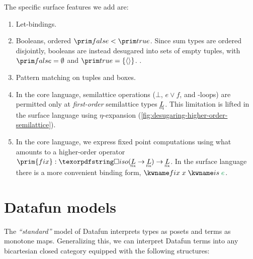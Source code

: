 \documentclass[nomarginums]{rntz}\usepackage[tablet]{fantasy}%
\begin{document}
The specific surface features we add are:
\begin{enumerate}
\item Let-bindings.

\item Booleans, ordered $\efalse < \etrue$. Since sum types are ordered
  disjointly, booleans are instead desugared into sets of empty tuples, with
  $\efalse = \emptyset$ and $\etrue = \eset{\etuple{}}$. .

\item Pattern matching on tuples and boxes. 

\item In the core language, semilattice operations ($\bot$, $e \vee f$, and
  -loops) are permitted only at \emph{first-order} semilattice types
  $\eqt L$. This limitation is lifted in the surface language using
  $\eta$-expansion (\cref{fig:desugaring-higher-order-semilattice}).

\item In the core language, we express fixed point computations using what
  amounts to a higher-order operator $\prim{fix} : \isof{(\fixt L \to \fixt L)}
  \to \fixt L$. In the surface language there is a more convenient binding form,
  $\efixisd x e$.

\end{enumerate}


\section{Datafun models}
\label{sec:datafun-models}

The \emph{``standard''} model of Datafun interprets types as posets and terms as
monotone maps. Generalizing this, we can interpret Datafun terms into any
bicartesian closed category \catC{} equipped with the following structures:
\end{document}
